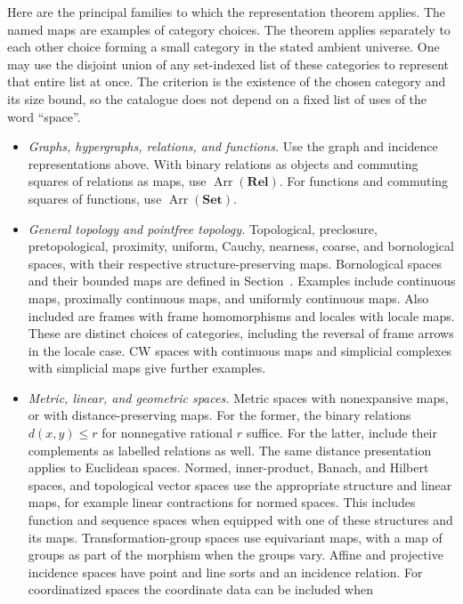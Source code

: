 Here are the principal families to which the representation theorem
applies. The named maps are examples of category choices. The theorem
applies separately to each other choice forming a small category in the
stated ambient universe. One may use the disjoint union of any
set-indexed list of these categories to represent that entire list at
once. The criterion is the existence of the chosen category and its
size bound, so the catalogue does not depend on a fixed list of uses
of the word ``space''.

\begin{itemize}
\item \emph{Graphs, hypergraphs, relations, and functions.}
Use the graph and incidence representations above. With binary relations
as objects and commuting squares of relations as maps, use
$\operatorname{Arr}(\mathbf{Rel})$. For functions and commuting squares of
functions, use $\operatorname{Arr}(\mathbf{Set})$.
\item \emph{General topology and pointfree topology.}
Topological, preclosure, pretopological, proximity, uniform, Cauchy,
nearness, coarse, and bornological spaces, with their respective
structure-preserving maps.  Bornological spaces and their bounded maps
are defined in Section~. Examples
include continuous maps, proximally
continuous maps, and uniformly continuous maps. Also included are frames
with frame homomorphisms and locales with locale maps. These are distinct
choices of categories, including the reversal of frame arrows in the
locale case. CW spaces with continuous maps and simplicial complexes
with simplicial maps give further examples.
\item \emph{Metric, linear, and geometric spaces.}
Metric spaces with nonexpansive maps, or with distance-preserving maps.
For the former, the binary relations $d(x,y)\le r$ for nonnegative
rational $r$ suffice. For the latter, include their complements as
labelled relations as well. The same distance presentation applies
to Euclidean spaces. Normed, inner-product, Banach, and Hilbert
spaces, and topological vector spaces use the appropriate structure and
linear maps, for example linear contractions for normed spaces.
This includes function and sequence spaces when equipped with one of
these structures and its maps.
Transformation-group spaces use equivariant maps, with a map of groups
as part of the morphism when the groups vary. Affine and projective
incidence spaces have point and line sorts and an incidence relation.
For coordinatized spaces the coordinate data can be included when

\end{itemize}
